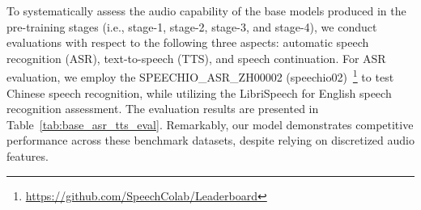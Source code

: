 \documentclass{article}
\begin{document}
To systematically assess the audio capability of the base models produced in the pre-training stages (i.e., stage-1, stage-2, stage-3, and stage-4), we conduct evaluations with respect to the following three aspects: automatic speech recognition (ASR), text-to-speech (TTS), and speech continuation.
For ASR evaluation, we employ the SPEECHIO\_ASR\_ZH00002 (speechio02)~\footnote{\url{https://github.com/SpeechColab/Leaderboard}} to test Chinese speech recognition, while utilizing the LibriSpeech \citep{panayotov2015librispeech} for English speech recognition assessment. 
The evaluation results are presented in Table~\ref{tab:base_asr_tts_eval}. Remarkably, our model demonstrates competitive performance across these benchmark datasets, despite relying on discretized audio features.

\begin{table}[h!]
\centering
\caption{ASR and TTS performance of base models during the pre-training stages. Word error rate (WER) (for English) or character error rate (CER) (for Chinese) in percentage are reported.}
\label{tab:base_asr_tts_eval}
\end{table}
\end{document}
